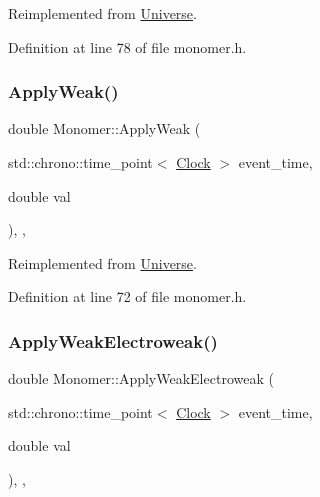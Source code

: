 Reimplemented from \hyperlink{class_universe_af7becebb347be9a85541d96a3eca1ca7}{Universe}.



Definition at line 78 of file monomer.\+h.

\mbox{\label{class_monomer_a176a1a4dfed1eaddc6637bbfd2660aba}} 
\subsubsection{\texorpdfstring{Apply\+Weak()}{ApplyWeak()}}
{\footnotesize\ttfamily double Monomer\+::\+Apply\+Weak (\begin{DoxyParamCaption}\item[{std\+::chrono\+::time\+\_\+point$<$ \hyperlink{universe_8h_a0ef8d951d1ca5ab3cfaf7ab4c7a6fd80}{Clock} $>$}]{event\+\_\+time,  }\item[{double}]{val }\end{DoxyParamCaption})\hspace{0.3cm}{\ttfamily [inline]}, {\ttfamily [final]}, {\ttfamily [virtual]}}



Reimplemented from \hyperlink{class_universe_a6d1226b3adec3c42a833afdbb6a65a92}{Universe}.



Definition at line 72 of file monomer.\+h.

\mbox{\label{class_monomer_a64f65c128ebc2428c42739c930696ea1}} 
\subsubsection{\texorpdfstring{Apply\+Weak\+Electroweak()}{ApplyWeakElectroweak()}}
{\footnotesize\ttfamily double Monomer\+::\+Apply\+Weak\+Electroweak (\begin{DoxyParamCaption}\item[{std\+::chrono\+::time\+\_\+point$<$ \hyperlink{universe_8h_a0ef8d951d1ca5ab3cfaf7ab4c7a6fd80}{Clock} $>$}]{event\+\_\+time,  }\item[{double}]{val }\end{DoxyParamCaption})\hspace{0.3cm}{\ttfamily [inline]}, {\ttfamily [final]}, {\ttfamily [virtual]}}



